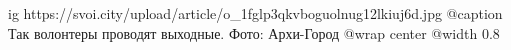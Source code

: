  
 
 
 
 

\ifcmt
  ig https://svoi.city/upload/article/o_1fglp3qkvboguolnug12lkiuj6d.jpg
  @caption Так волонтеры проводят выходные. Фото: Архи-Город
  @wrap center
  @width 0.8
\fi
